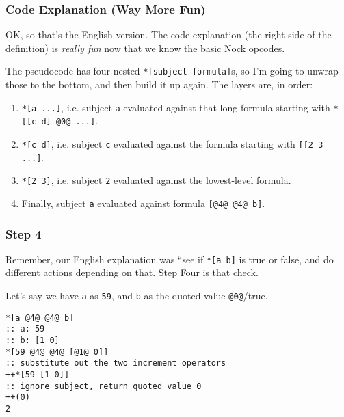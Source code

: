 \documentclass[twoside]{article}
\begin{document}
\subsubsection{Code Explanation (Way More Fun)}

OK, so that's the English version. The code explanation (the right side of the definition) is \emph{really fun} now that we know the basic Nock opcodes.

The pseudocode has four nested \lstinline[style=inlinecode]{*[subject formula]}s, so I'm going to unwrap those to the bottom, and then build it up again. The layers are, in order:

\begin{enumerate}
  \item  \lstinline[style=inlinecode]{*[a ...]}, i.e. subject \lstinline[style=inlinecode]{a} evaluated against that long formula starting with \lstinline[style=inlinecode]{*[[c d] @0@ ...]}.
  \item  \lstinline[style=inlinecode]{*[c d]}, i.e. subject \lstinline[style=inlinecode]{c} evaluated against the formula starting with \lstinline[style=inlinecode]{[[2 3 ...]}.
  \item  \lstinline[style=inlinecode]{*[2 3]}, i.e. subject \lstinline[style=inlinecode]{2} evaluated against the lowest-level formula.
  \item  Finally, subject \lstinline[style=inlinecode]{a} evaluated against formula \lstinline[style=inlinecode]{[@4@ @4@ b]}.
\end{enumerate}

\subsubsection{Step 4}

Remember, our English explanation was ``see if \lstinline[style=inlinecode]{*[a b]} is true or false, and do different actions depending on that. Step Four is that check.

Let's say we have \lstinline[style=inlinecode]{a} as \lstinline[style=inlinecode]{59}, and \lstinline[style=inlinecode]{b} as the quoted value \lstinline[style=inlinecode]{@0@}/true.

\begin{lstlisting}[style=listingblock]
*[a @4@ @4@ b]
:: a: 59
:: b: [1 0]
*[59 @4@ @4@ [@1@ 0]]
:: substitute out the two increment operators
++*[59 [1 0]]
:: ignore subject, return quoted value 0
++(0)
2
\end{lstlisting}
\end{document}
